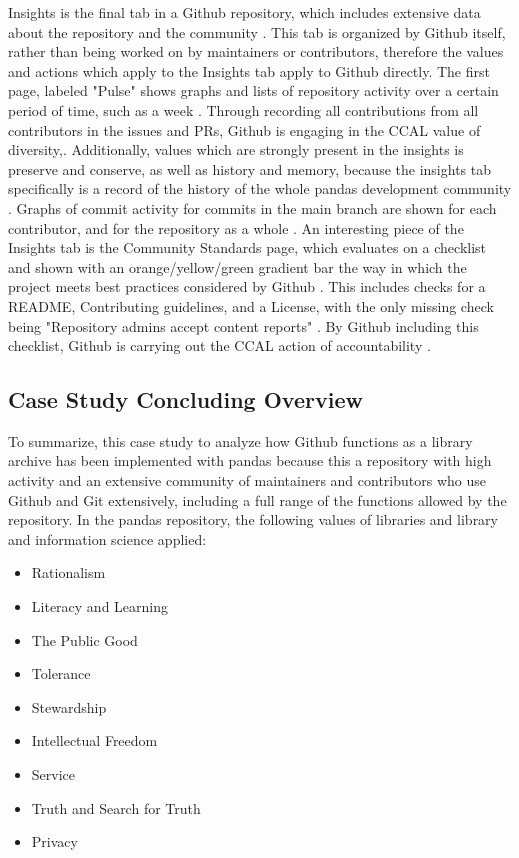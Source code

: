 Insights is the final tab in a Github repository, which includes extensive data about the repository and the community \cite{pandasrepo}. This tab is organized by Github itself, rather than being worked on by maintainers or contributors, therefore the values and actions which apply to the Insights tab apply to Github directly.  The first page, labeled "Pulse" shows graphs and lists of repository activity over a certain period of time, such as a week \cite{pandasrepo}. Through recording all contributions from all contributors in the issues and PRs, Github is engaging in the CCAL value of diversity,\cite{rubin2016foundationslis}. Additionally, values which are strongly present in the insights is preserve and conserve, as well as history and memory, because the insights tab specifically is a record of the history of the whole pandas development community \cite{rubin2016foundationslis} \cite{pandasrepo}. Graphs of commit activity for commits in the main branch are shown for each contributor, and for the repository as a whole \cite{pandasrepo}. An interesting piece of the Insights tab is the Community Standards page, which evaluates on a checklist and shown with an orange/yellow/green gradient bar the way in which the project meets best practices considered by Github \cite{pandasrepo}. This includes checks for a README, Contributing guidelines, and a License, with the only missing check being "Repository admins accept content reports" \cite{pandasrepo}. By Github including this checklist, Github is carrying out the CCAL action of accountability \cite{rubin2016foundationslis}. 

\subsection{Case Study Concluding Overview}

To summarize, this case study to analyze how Github functions as a library archive has been implemented with pandas because this a repository with high activity and an extensive community of maintainers and contributors who use Github and Git extensively, including a full range of the functions allowed by the repository. In the pandas repository, the following values of libraries and library and information science applied: 

\begin{itemize}
  \item Rationalism \cite{gorman2000values}
  \item Literacy and Learning \cite{gorman2000values}
  \item The Public Good \cite{rubin2016foundationslis}
  \item Tolerance \cite{rubin2016foundationslis}
  \item Stewardship \cite{gorman2000values}
  \item Intellectual Freedom \cite{gorman2000values}
  \item Service \cite{gorman2000values} \cite{rubin2016foundationslis}
  \item Truth and Search for Truth \cite{rubin2016foundationslis}
  \item Privacy \cite{gorman2000values}
\end{itemize}


